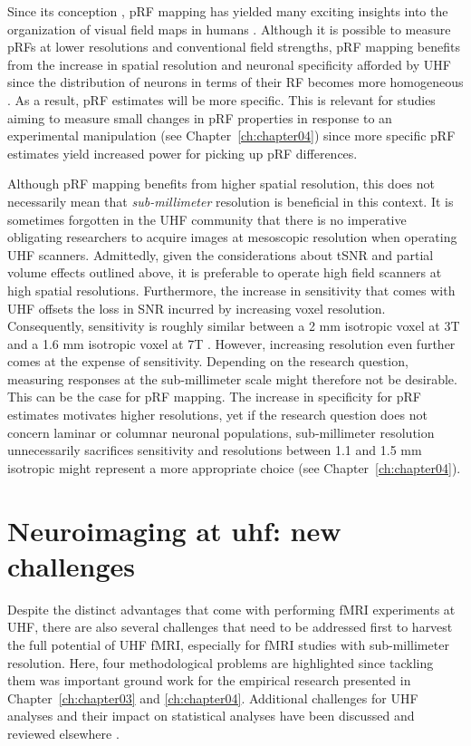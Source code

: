 Since its conception \parencite{Dumoulin2008}, pRF mapping has yielded many exciting insights into the organization of visual field maps in humans \parencite{Amano2009, Winawer2010, Harvey2011, Zuiderbaan2012, Kay2013, Klein2014, Kay2015, Harvey2015, Fracasso2016}. Although it is possible to measure pRFs at lower resolutions and conventional field strengths, pRF mapping benefits from the increase in spatial resolution and neuronal specificity afforded by UHF since the distribution of neurons in terms of their RF becomes more homogeneous \parencite{DeMartino2016}. As a result, pRF estimates will be more specific. This is relevant for studies aiming to measure small changes in pRF properties in response to an experimental manipulation (see Chapter~\ref{ch:chapter04}) since more specific pRF estimates yield increased power for picking up pRF differences.

Although pRF mapping benefits from higher spatial resolution, this does not necessarily mean that \textit{sub-millimeter} resolution is beneficial in this context. It is sometimes forgotten in the UHF community that there is no imperative obligating researchers to acquire images at mesoscopic resolution when operating UHF scanners. Admittedly, given the considerations about tSNR and partial volume effects outlined above, it is preferable to operate high field scanners at high spatial resolutions. Furthermore, the increase in sensitivity that comes with UHF offsets the loss in SNR incurred by increasing voxel resolution. Consequently, sensitivity is roughly similar between a 2 mm isotropic voxel at 3T and a 1.6 mm isotropic voxel at 7T \parencite{DeMartino2016}. However, increasing resolution even further comes at the expense of sensitivity. Depending on the research question, measuring responses at the sub-millimeter scale might therefore not be desirable. This can be the case for pRF mapping. The increase in specificity for pRF estimates motivates higher resolutions, yet if the research question does not concern laminar or columnar neuronal populations, sub-millimeter resolution unnecessarily sacrifices sensitivity and resolutions between 1.1 and 1.5 mm isotropic might represent a more appropriate choice (see Chapter~\ref{ch:chapter04}).

\section{Neuroimaging at uhf: new challenges}
Despite the distinct advantages that come with performing fMRI experiments at UHF, there are also several challenges that need to be addressed first to harvest the full potential of UHF fMRI, especially for fMRI studies with sub-millimeter resolution. Here, four methodological problems are highlighted since tackling them was important ground work for the empirical research presented in Chapter~\ref{ch:chapter03} and \ref{ch:chapter04}. Additional challenges for UHF analyses and their impact on statistical analyses have been discussed and reviewed elsewhere \parencite{Polimeni2017, DeMartino2016}.

